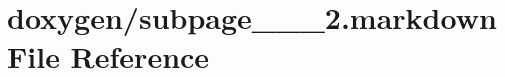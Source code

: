 \hypertarget{subpage__1__1__2_8markdown}{}\section{doxygen/subpage\+\_\+\_\+\_\+2.markdown File Reference}
\label{subpage__1__1__2_8markdown}
